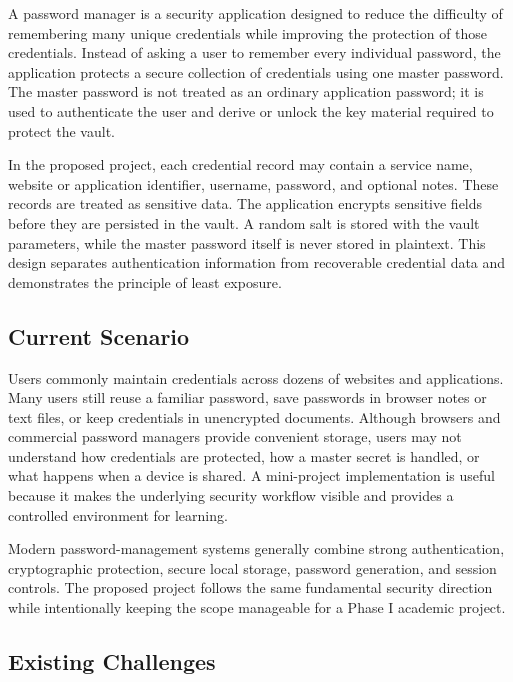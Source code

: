 \documentclass[12pt,a4paper,oneside]{report}
\begin{document}
A password manager is a security application designed to reduce the difficulty of remembering many unique credentials while improving the protection of those credentials. Instead of asking a user to remember every individual password, the application protects a secure collection of credentials using one master password. The master password is not treated as an ordinary application password; it is used to authenticate the user and derive or unlock the key material required to protect the vault.

In the proposed project, each credential record may contain a service name, website or application identifier, username, password, and optional notes. These records are treated as sensitive data. The application encrypts sensitive fields before they are persisted in the vault. A random salt is stored with the vault parameters, while the master password itself is never stored in plaintext. This design separates authentication information from recoverable credential data and demonstrates the principle of least exposure.

\subsection{Current Scenario}

Users commonly maintain credentials across dozens of websites and applications. Many users still reuse a familiar password, save passwords in browser notes or text files, or keep credentials in unencrypted documents. Although browsers and commercial password managers provide convenient storage, users may not understand how credentials are protected, how a master secret is handled, or what happens when a device is shared. A mini-project implementation is useful because it makes the underlying security workflow visible and provides a controlled environment for learning.

Modern password-management systems generally combine strong authentication, cryptographic protection, secure local storage, password generation, and session controls. The proposed project follows the same fundamental security direction while intentionally keeping the scope manageable for a Phase I academic project.

\subsection{Existing Challenges}
\end{document}
